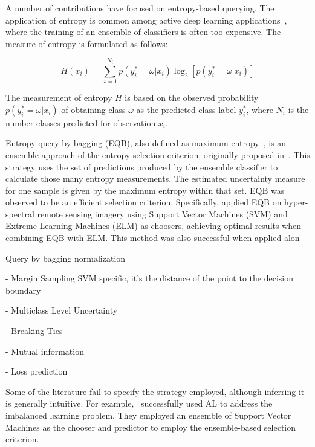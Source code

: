 \documentclass[parskip=full]{scrartcl}
\begin{document}
A number of contributions have focused on entropy-based querying. The application of entropy is
common among active deep learning applications~\cite{Aghdam2019}, where the training of an ensemble
of classifiers is often too expensive. The measure of entropy is formulated as follows:

\begin{equation}
    H(x_i) = \sum_{\omega=1}^{N_i}{p(y_{i}^{*}=\omega|x_i)}\log_2[p(y_{i}^{*}=\omega|x_i)]
\end{equation}

The measurement of entropy $H$ is based on the observed probability $p(y_{i}^{*}=\omega|x_i)$ of
obtaining class $\omega$ as the predicted class label $y_{i}^{*}$, where $N_i$ is the number classes
predicted for observation $x_i$.

Entropy query-by-bagging (EQB), also defined as maximum entropy~\cite{Liu2020}, is an ensemble approach of
the entropy selection criterion, originally proposed in~\cite{Tuia2009}. This strategy uses the set
of predictions produced by the ensemble classifier to calculate those many entropy measurements.
The estimated uncertainty measure for one sample is given by the maximum entropy within that set.
EQB was observed to be an efficient selection criterion. Specifically, \cite{Shrivastava2021}
applied EQB on hyper-spectral remote sensing imagery using Support Vector Machines (SVM) and Extreme
Learning Machines (ELM) as choosers, achieving optimal results when combining EQB with ELM. This
method was also successful when applied alon




Query by bagging normalization~\cite{Copa2010}

\cite{Shrivastava2021}


- Margin Sampling
\cite{Shrivastava2021}
SVM specific, it's the distance of the point to the decision boundary

- Multiclass Level Uncertainty
\cite{Shrivastava2021}

- Breaking Ties 

- Mutual information

- Loss prediction~\cite{Yoo2019} 

Some of the literature fail to specify the strategy employed, although inferring it is generally
intuitive. For example,~\cite{Ertekin2007} successfully used AL to address the imbalanced learning
problem. They employed an ensemble of Support Vector Machines as the chooser and predictor to employ
the ensemble-based selection criterion.
\end{document}
